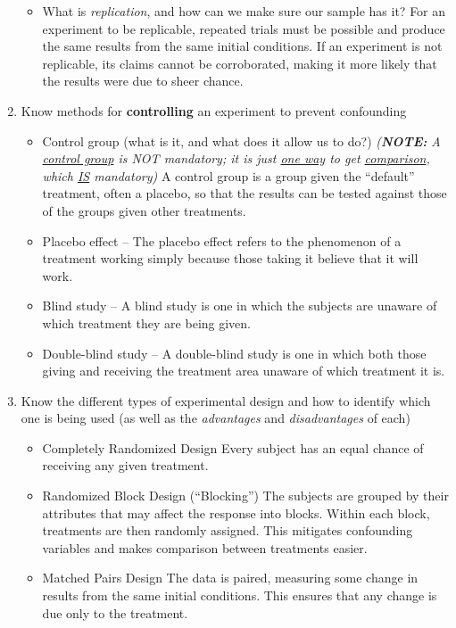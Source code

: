 \documentclass[12pt, A4]{report}
\begin{document}
\begin{enumerate}
\begin{itemize}
							\item
								What is \emph{replication}, and how can we make sure our sample has it?
									\subitem
										For an experiment to be replicable, repeated trials must be possible and produce the same results from the same initial conditions. If an experiment is not replicable, its claims cannot be corroborated, making it more likely that the results were due to sheer chance.
						\end{itemize}
				\item
					Know methods for \textbf{controlling} an experiment to prevent confounding
						\begin{itemize}
							\item
								Control group (what is it, and what does it allow us to do?)
								\subitem
								\emph{(\textbf{NOTE:} A \underline{control group} is NOT mandatory; it is just \underline{one way} to get \underline{comparison}, which \underline{IS} mandatory)}
									\subitem
										A control group is a group given the \enquote{default} treatment, often a placebo, so that the results can be tested against those of the groups given other treatments.
							\item
								Placebo effect --
									\subitem
										The placebo effect refers to the phenomenon of a treatment working simply because those taking it believe that it will work.
							\item
								Blind study --
									\subitem
										A blind study is one in which the subjects are unaware of which treatment they are being given.
							\item
								Double-blind study --
									\subitem
										A double-blind study is one in which both those giving and receiving the treatment area unaware of which treatment it is.
						\end{itemize}
					\item
						Know the different types of experimental design and how to identify which one is being used (as well as the \emph{advantages} and \emph{disadvantages} of each)
						\begin{itemize}
							\item
								Completely Randomized Design
									\subitem
										Every subject has an equal chance of receiving any given treatment.
							\item
								Randomized Block Design (\enquote{Blocking}) 
									\subitem
										The subjects are grouped by their attributes that may affect the response into blocks. Within each block, treatments are then randomly assigned. This mitigates confounding variables and makes comparison between treatments easier.
							\item
								Matched Pairs Design
									\subitem
										The data is paired, measuring some change in results from the same initial conditions. This ensures that any change is due only to the treatment.
						\end{itemize}
			\end{enumerate}
\end{document}
